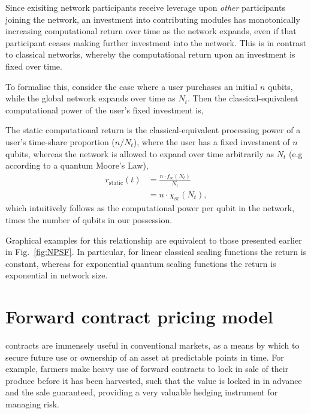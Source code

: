 Since exisiting network participants receive leverage upon \textit{other} participants joining the network, an investment into contributing modules has monotonically increasing computational return over time as the network expands, even if that participant ceases making further investment into the network. This is in contrast to classical networks, whereby the computational return upon an investment is fixed over time.

To formalise this, consider the case where a user purchases an initial $n$ qubits, while the global network expands over time as $N_t$. Then the classical-equivalent computational power of the user's fixed investment is,

\begin{definition} The static computational return is the classical-equivalent processing power of a user's time-share proportion (\mbox{$n/N_t$}), where the user has a fixed investment of $n$ qubits, whereas the network is allowed to expand over time arbitrarily as $N_t$ (e.g according to a quantum Moore's Law),
\begin{align}
	r_\mathrm{static}(t) &= \frac{n\cdot f_\mathrm{sc}(N_t)}{N_t}\nonumber\\
	&= n\cdot\chi_\mathrm{sc}(N_t),
\end{align}
which intuitively follows as the computational power per qubit in the network, times the number of qubits in our possession.
\end{definition}

Graphical examples for this relationship are equivalent to those presented earlier in Fig.~\ref{fig:NPSF}. In particular, for linear classical scaling functions the return is constant, whereas for exponential quantum scaling functions the return is exponential in network size.

%
%

\section{Forward contract pricing model}\label{sec:for_contr}

 contracts are immensely useful in conventional markets, as a means by which to secure future use or ownership of an asset at predictable points in time. For example, farmers make heavy use of forward contracts to lock in sale of their produce before it has been harvested, such that the value is locked in in advance and the sale guaranteed, providing a very valuable hedging instrument for managing risk.

